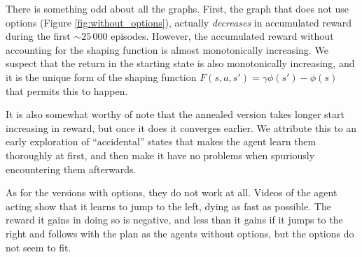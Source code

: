 
There is something odd about all the graphs. First, the graph that does not use
options (Figure \ref{fig:without_options}),
actually \emph{decreases} in accumulated reward during the first $\sim 25\,000$
episodes. However, the accumulated reward without accounting for the shaping
function is almost monotonically increasing. We suspect that the return in the
starting state is also monotonically increasing, and it is the unique form of
the shaping function $F(s, a, s') = \gamma\phi(s') - \phi(s)$ that permits this
to happen.

It is also somewhat worthy of note that the annealed version takes longer start
increasing in reward, but once it does it converges earlier. We attribute this
to an early exploration of ``accidental'' states that makes the agent learn them
thoroughly at first, and then make it have no problems when spuriously
encountering them afterwards.

As for the versions with options, they do not work at all. Videos of
the agent acting show that it learns to jump to the left, dying as fast as
possible. The reward it gains in doing so is negative, and less than it gains if
it jumps to the right and follows with the plan as the agents without options,
but the options do not seem to fit.
  



